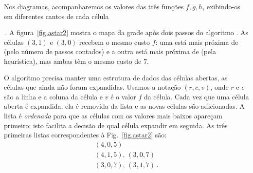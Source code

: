 {Nos diagramas, acompanharemos os valores das três funções $f,g,h$, exibindo-os em diferentes cantos de cada célula
\,.
A figura~\ref{fig.astar2} mostra o mapa da grade após dois passos do algoritmo \astar{}. As células $(3,1)$ e $(3,0)$ recebem o mesmo custo $f$: uma está mais próxima de  (pelo número de passos contados) e a outra está mais próxima de  (pela heurística), mas ambas têm o mesmo custo de $7$.

O algoritmo precisa manter uma estrutura de dados das células abertas, as células que ainda não foram expandidas. Usamos a notação $(r,c,v)$, onde $r$ e $c$ são a linha e a coluna da célula e $v$ é o valor $f$ da célula. Cada vez que uma célula aberta é expandida, ela é removida da lista e as novas células são adicionadas. A lista é \emph{ordenada} para que as células com os valores mais baixos apareçam primeiro; isto facilita a decisão de qual célula expandir em seguida. As três primeiras listas correspondentes à Fig.~\ref{fig.astar2} são:
\begin{displaymath}
\begin{array}{l}
(4,0,5)\\
(4,1,5),\,(3,0,7)\\
(3,0,7),\,(3,1,7)\,.
\end{array}
\end{displaymath}

}
